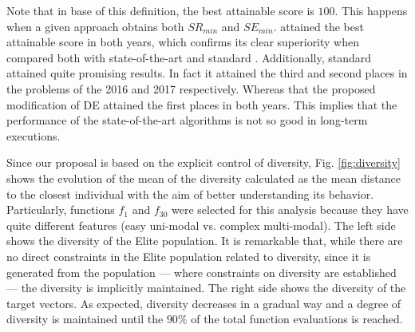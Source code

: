 Note that in base of this definition, the best attainable score is $100$.
%
This happens when a given approach obtains both $SR_{min}$ and $SE_{min}$.
%
\DEEDM{} attained the best attainable score in both years, which confirms its clear superiority when compared both with state-of-the-art and standard \DE{}.
%
Additionally, standard \DE{} attained quite promising results.
%
In fact it attained the third and second places in the problems of the \CEC{} 2016 and \CEC{} 2017 respectively.
%
Whereas that the proposed modification of DE attained the first places in both years.
%
This implies that the performance of the state-of-the-art algorithms is not so good in long-term executions.
%
%
%
%


Since our proposal is based on the explicit control of diversity, Fig. \ref{fig:diversity} shows the evolution of the mean of the diversity calculated
as the mean distance to the closest individual with the aim of better understanding its behavior.
%
Particularly, functions $f_1$ and $f_{30}$ were selected for this analysis because they have quite different features (easy uni-modal vs. complex multi-modal).
%
The left side shows the diversity of the Elite population.
%
It is remarkable that, while there are no direct constraints in the Elite population related to diversity, since it is generated from the population --- where constraints on diversity
are established --- the diversity is implicitly maintained.
%
The right side shows the diversity of the target vectors.
%
As expected, diversity decreases in a gradual way and a degree of diversity is maintained until the $90\%$ of the total function evaluations is reached.

